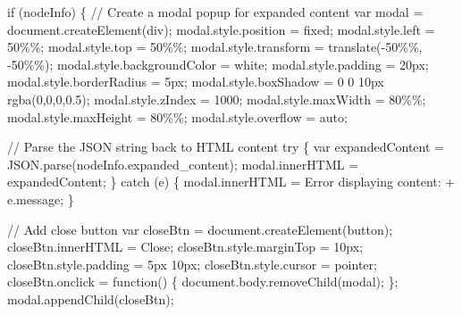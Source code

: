 \documentclass[
  11pt,
  letterpaper,
]{book}
\newenvironment{Shaded}{\begin{snugshade}}{\end{snugshade}}
\newcommand{\SpecialCharTok}[1]{\textcolor[rgb]{0.37,0.37,0.37}{#1}}
\newcommand{\StringTok}[1]{\textcolor[rgb]{0.13,0.47,0.30}{#1}}
\begin{document}
\begin{Shaded}
\begin{Highlighting}[]
\StringTok{            if (nodeInfo) \{}
\StringTok{                // Create a modal popup for expanded content}
\StringTok{                var modal = document.createElement(\textquotesingle{}div\textquotesingle{});}
\StringTok{                modal.style.position = \textquotesingle{}fixed\textquotesingle{};}
\StringTok{                modal.style.left = \textquotesingle{}50}\SpecialCharTok{\%\%}\StringTok{\textquotesingle{};}
\StringTok{                modal.style.top = \textquotesingle{}50}\SpecialCharTok{\%\%}\StringTok{\textquotesingle{};}
\StringTok{                modal.style.transform = \textquotesingle{}translate({-}50}\SpecialCharTok{\%\%}\StringTok{, {-}50}\SpecialCharTok{\%\%}\StringTok{)\textquotesingle{};}
\StringTok{                modal.style.backgroundColor = \textquotesingle{}white\textquotesingle{};}
\StringTok{                modal.style.padding = \textquotesingle{}20px\textquotesingle{};}
\StringTok{                modal.style.borderRadius = \textquotesingle{}5px\textquotesingle{};}
\StringTok{                modal.style.boxShadow = \textquotesingle{}0 0 10px rgba(0,0,0,0.5)\textquotesingle{};}
\StringTok{                modal.style.zIndex = \textquotesingle{}1000\textquotesingle{};}
\StringTok{                modal.style.maxWidth = \textquotesingle{}80}\SpecialCharTok{\%\%}\StringTok{\textquotesingle{};}
\StringTok{                modal.style.maxHeight = \textquotesingle{}80}\SpecialCharTok{\%\%}\StringTok{\textquotesingle{};}
\StringTok{                modal.style.overflow = \textquotesingle{}auto\textquotesingle{};}

\StringTok{                // Parse the JSON string back to HTML content}
\StringTok{                try \{}
\StringTok{                    var expandedContent = JSON.parse(nodeInfo.expanded\_content);}
\StringTok{                    modal.innerHTML = expandedContent;}
\StringTok{                \} catch (e) \{}
\StringTok{                    modal.innerHTML = \textquotesingle{}Error displaying content: \textquotesingle{} + e.message;}
\StringTok{                \}}

\StringTok{                // Add close button}
\StringTok{                var closeBtn = document.createElement(\textquotesingle{}button\textquotesingle{});}
\StringTok{                closeBtn.innerHTML = \textquotesingle{}Close\textquotesingle{};}
\StringTok{                closeBtn.style.marginTop = \textquotesingle{}10px\textquotesingle{};}
\StringTok{                closeBtn.style.padding = \textquotesingle{}5px 10px\textquotesingle{};}
\StringTok{                closeBtn.style.cursor = \textquotesingle{}pointer\textquotesingle{};}
\StringTok{                closeBtn.onclick = function() \{}
\StringTok{                    document.body.removeChild(modal);}
\StringTok{                \};}
\StringTok{                modal.appendChild(closeBtn);}


\end{Highlighting}
\end{Shaded}
\end{document}

